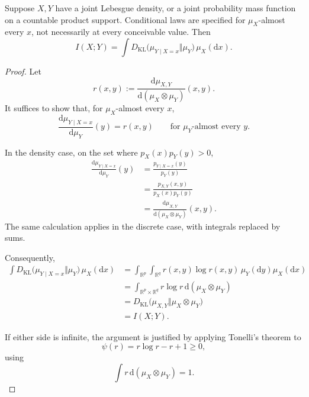 \begin{proposition}
Suppose $X,Y$ have a joint Lebesgue density, or a joint probability
mass function on a countable product support. Conditional laws are
specified for $\mu_X$-almost every $x$, not necessarily at every
conceivable value. Then
\begin{equation}
I(X;Y)
=
\int
D_{\mathrm{KL}}
\bigl(\mu_{Y\mid X=x}\Vert\mu_Y\bigr)
\,\mu_X(\mathrm{d}x).
\end{equation}
\end{proposition}
\begin{proof}
Let
\[
r(x,y)
:=
\frac{\mathrm{d}\mu_{X,Y}}
     {\mathrm{d}(\mu_X\otimes\mu_Y)}(x,y).
\]
It suffices to show that, for $\mu_X$-almost every $x$,
\[
\frac{\mathrm{d}\mu_{Y\mid X=x}}
     {\mathrm{d}\mu_Y}(y)
=
r(x,y)
\qquad
\text{for $\mu_Y$-almost every $y$}.
\]

In the density case, on the set where $p_X(x)p_Y(y)>0$,
\[
\begin{aligned}
\frac{\mathrm{d}\mu_{Y\mid X=x}}
     {\mathrm{d}\mu_Y}(y)
&=
\frac{p_{Y\mid X=x}(y)}{p_Y(y)}\\
&=
\frac{p_{X,Y}(x,y)}
     {p_X(x)p_Y(y)}\\
&=
\frac{\mathrm{d}\mu_{X,Y}}
     {\mathrm{d}(\mu_X\otimes\mu_Y)}(x,y).
\end{aligned}
\]
The same calculation applies in the discrete case, with integrals
replaced by sums.

Consequently,
\begin{align*}
\int
D_{\mathrm{KL}}
\bigl(\mu_{Y\mid X=x}\Vert\mu_Y\bigr)
\,\mu_X(\mathrm{d}x)
&=
\int_{\mathbb{R}^p}
\int_{\mathbb{R}^q}
r(x,y)\log r(x,y)\,
\mu_Y(\mathrm{d}y)\mu_X(\mathrm{d}x)\\
&=
\int_{\mathbb{R}^p\times\mathbb{R}^q}
r\log r\,
\mathrm{d}(\mu_X\otimes\mu_Y)\\
&=
D_{\mathrm{KL}}
\bigl(\mu_{X,Y}\Vert\mu_X\otimes\mu_Y\bigr)\\
&=
I(X;Y).
\end{align*}

If either side is infinite, the argument is justified by applying
Tonelli's theorem to
\[
\psi(r)=r\log r-r+1\geq0,
\]
using
\[
\int r\,\mathrm{d}(\mu_X\otimes\mu_Y)=1.
\]
\end{proof}